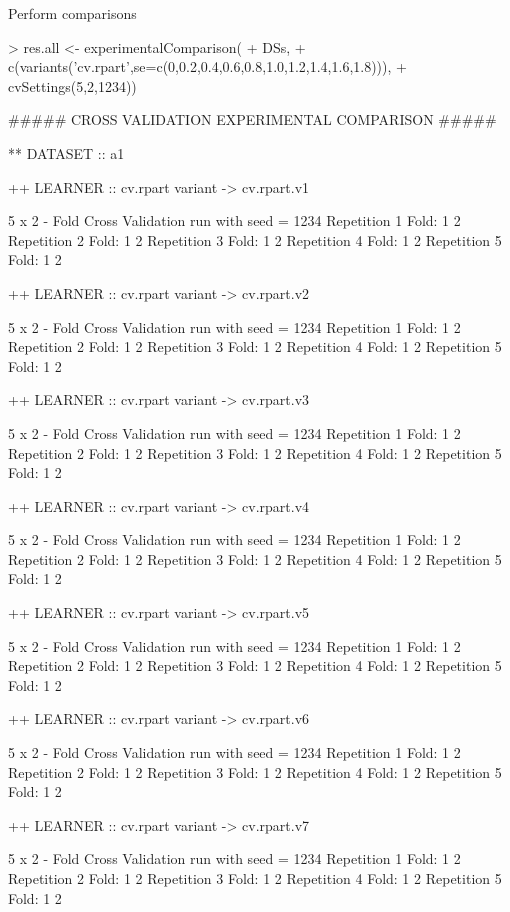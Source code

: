 \documentclass{article}
\begin{document}
Perform comparisons
\begin{Schunk}
\begin{Sinput}
> res.all <- experimentalComparison(
+ DSs,
+ c(variants('cv.rpart',se=c(0,0.2,0.4,0.6,0.8,1.0,1.2,1.4,1.6,1.8))),
+ cvSettings(5,2,1234))
\end{Sinput}
\begin{Soutput}
#####  CROSS VALIDATION  EXPERIMENTAL COMPARISON #####

** DATASET :: a1

++ LEARNER :: cv.rpart  variant ->  cv.rpart.v1 

 5 x 2 - Fold Cross Validation run with seed =  1234 
Repetition  1 
Fold:  1  2
Repetition  2 
Fold:  1  2
Repetition  3 
Fold:  1  2
Repetition  4 
Fold:  1  2
Repetition  5 
Fold:  1  2


++ LEARNER :: cv.rpart  variant ->  cv.rpart.v2 

 5 x 2 - Fold Cross Validation run with seed =  1234 
Repetition  1 
Fold:  1  2
Repetition  2 
Fold:  1  2
Repetition  3 
Fold:  1  2
Repetition  4 
Fold:  1  2
Repetition  5 
Fold:  1  2


++ LEARNER :: cv.rpart  variant ->  cv.rpart.v3 

 5 x 2 - Fold Cross Validation run with seed =  1234 
Repetition  1 
Fold:  1  2
Repetition  2 
Fold:  1  2
Repetition  3 
Fold:  1  2
Repetition  4 
Fold:  1  2
Repetition  5 
Fold:  1  2


++ LEARNER :: cv.rpart  variant ->  cv.rpart.v4 

 5 x 2 - Fold Cross Validation run with seed =  1234 
Repetition  1 
Fold:  1  2
Repetition  2 
Fold:  1  2
Repetition  3 
Fold:  1  2
Repetition  4 
Fold:  1  2
Repetition  5 
Fold:  1  2


++ LEARNER :: cv.rpart  variant ->  cv.rpart.v5 

 5 x 2 - Fold Cross Validation run with seed =  1234 
Repetition  1 
Fold:  1  2
Repetition  2 
Fold:  1  2
Repetition  3 
Fold:  1  2
Repetition  4 
Fold:  1  2
Repetition  5 
Fold:  1  2


++ LEARNER :: cv.rpart  variant ->  cv.rpart.v6 

 5 x 2 - Fold Cross Validation run with seed =  1234 
Repetition  1 
Fold:  1  2
Repetition  2 
Fold:  1  2
Repetition  3 
Fold:  1  2
Repetition  4 
Fold:  1  2
Repetition  5 
Fold:  1  2


++ LEARNER :: cv.rpart  variant ->  cv.rpart.v7 

 5 x 2 - Fold Cross Validation run with seed =  1234 
Repetition  1 
Fold:  1  2
Repetition  2 
Fold:  1  2
Repetition  3 
Fold:  1  2
Repetition  4 
Fold:  1  2
Repetition  5 
Fold:  1  2



\end{Soutput}
\end{Schunk}
\end{document}
